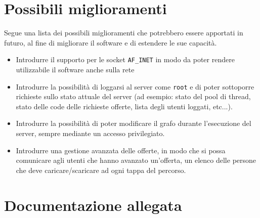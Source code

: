 \documentclass[a4paper,10pt]{article}
\begin{document}
\section{Possibili miglioramenti}

Segue una lista dei possibili miglioramenti che potrebbero essere apportati in futuro, al fine di migliorare il software e di estendere le sue capacit\`a.

\begin{itemize}
	\item Introdurre il supporto per le socket \texttt{AF\_INET} in modo da poter rendere utilizzabile il software anche sulla rete
	\item Introdurre la possibilit\`a di loggarsi al server come \texttt{root} e di poter sottoporre richieste sullo stato attuale del server (ad esempio: stato del pool di thread, stato delle code delle richieste offerte, lista degli utenti loggati, etc...).
	\item Introdurre la possibilit\`a di poter modificare il grafo durante l'esecuzione del server, sempre mediante un accesso privilegiato.
	\item Introdurre una gestione avanzata delle offerte, in modo che si possa comunicare agli utenti che hanno avanzato un'offerta, un elenco delle persone che deve caricare/scaricare ad ogni tappa del percorso.
\end{itemize}

\section{Documentazione allegata}
\end{document}
